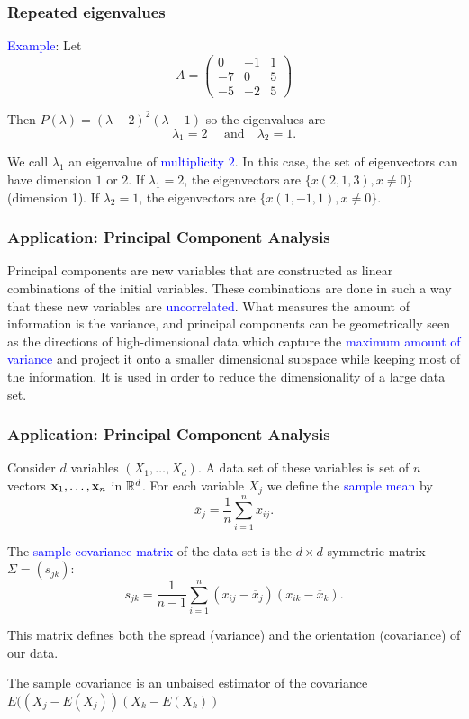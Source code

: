 \documentclass[11pt,aspectratio=169]{beamer}
\begin{document}
\begin{frame}
\frametitle{Repeated eigenvalues}
\begin{small}
 \textcolor{blue}{Example}: Let 
$$A=\begin{pmatrix}
0&-1&1  \\
-7&0&5 \\
-5&-2&5
\end{pmatrix}$$

Then $P(\lambda)=(\lambda-2)^2(\lambda-1)$ so the eigenvalues are  $$\lambda_1=2\quad \text{ and} \quad \lambda_2=1.$$

 We call $\lambda_1$ an eigenvalue of \textcolor{blue}{multiplicity $2$}. In this case, the set of eigenvectors can have dimension $1$ or $2$.
\vskip 10pt
 If  $\lambda_1=2$, the eigenvectors are $\{x(2,1,3), x\neq 0\}$ (dimension 1).
\vskip 10pt
 If  $\lambda_2=1$, the eigenvectors are $\{x(1,-1,1), x\neq 0\}$. 

\end{small}
\end{frame}

\begin{frame}
\frametitle{Application: Principal Component Analysis}
\begin{small}
 Principal components are new variables that are constructed as linear combinations of the initial variables.
 \vskip 12pt 
 These combinations are done in such a way that these new variables are \textcolor{blue}{uncorrelated}.
\vskip 12pt
 What measures the amount of information is the variance, and principal components can be geometrically seen as the directions of high-dimensional data which capture the \textcolor{blue}{maximum amount of variance} and project it onto a smaller dimensional subspace while keeping most of the information.
\vskip 12pt
 It is used in order to reduce the dimensionality of a large data set.

\end{small}
\end{frame}
\begin{frame}
\frametitle{Application: Principal Component Analysis}
\begin{small}
Consider $d$
variables $(X_1,\ldots, X_d)$. 
A data set of these variables is set of $n$ vectors 
$
{\bf x}_1, \ldots, {\bf x}_n
$ in $\mathbb R^d$.
\vskip 10pt
For each variable $X_j$ we define the \textcolor{blue}{sample mean} by $$\overline{x}_j=\frac{1}{n}\sum_{i=1}^n x_{ij}.$$


The  \textcolor{blue}{sample covariance matrix}  of the data set is the $d \times d$ symmetric matrix $\Sigma=(s_{jk})$:
$$
s_{jk}=\frac{1}{n-1}\sum_{i=1}^n (x_{ij}-\overline{x}_j)(x_{ik}-\overline{x}_k).
$$


This matrix defines both the spread (variance) and the orientation (covariance) of our data. 

\begin{tiny} The sample covariance is an unbaised estimator of the covariance
$E((X_j-E(X_j))(X_k-E(X_k))$ \end{tiny}
\end{small}
\end{frame}
\end{document}

